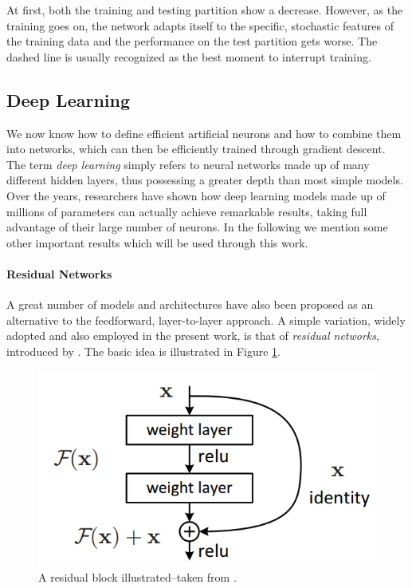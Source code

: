 At first, both the training and testing partition show a decrease. However, as the training goes on, the network adapts itself to the specific, stochastic features of the training data and the performance on the test partition gets worse. The dashed line is usually recognized as the best moment to interrupt training. 

\subsection{Deep Learning}
We now know how to define efficient artificial neurons and how to combine them into networks, which can then be efficiently trained through gradient descent. 
The term \emph{deep learning} simply refers to neural networks made up of many different hidden layers, thus possessing a greater depth than most simple models. Over the years, researchers have shown how deep learning models made up of millions of parameters can actually achieve remarkable results, taking full advantage of their large number of neurons. In the following we mention some other important results which will be used through this work.

\paragraph{Residual Networks}
A great number of models and architectures have also been proposed as an alternative to the feedforward, layer-to-layer approach. A simple variation, widely adopted and also employed in the present work, is that of \emph{residual networks}, introduced by \cite{DBLP:journals/corr/HeZRS15}. The basic idea is illustrated in Figure \ref{fig:resnet}.

\begin{figure}
    \centering
    \includegraphics[width=\columnwidth]{gfx/ch3/residual.png}
    \caption[A residual block]{A residual block illustrated--taken from \cite{DBLP:journals/corr/HeZRS15}.}
    \label{fig:resnet}
\end{figure}

